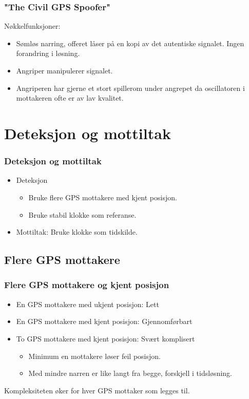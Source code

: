 \documentclass[xcolor=table]{beamer}
\begin{document}
\begin{frame}
  \frametitle{"The Civil GPS Spoofer"}
  Nøkkelfunksjoner:
  \begin{itemize}
    \item Sømløs narring, offeret låser på en kopi av det autentiske signalet. Ingen forandring i løsning.
    \item Angriper manipulerer signalet.
    \item Angriperen har gjerne et stort spillerom under angrepet da oscillatoren i mottakeren ofte er av lav kvalitet.
  \end{itemize}
\end{frame}

\section{Deteksjon og mottiltak}
\begin{frame}
\frametitle{Deteksjon og mottiltak}
  \begin{itemize}
    \item Deteksjon
    \begin{itemize}
      \item Bruke flere GPS mottakere med kjent posisjon.
      \item Bruke stabil klokke som referanse.
    \end{itemize}
    \item Mottiltak: Bruke klokke som tidskilde.
  \end{itemize}
\end{frame}

\subsection{Flere GPS mottakere}
\begin{frame} 
  \frametitle{Flere GPS mottakere og kjent posisjon}
  \begin{itemize}
    \item En GPS mottakere med ukjent posisjon: Lett
    \item En GPS mottakere med kjent posisjon: Gjennomførbart
    \item To GPS mottakere med kjent posisjon: Svært komplisert
    \begin{itemize}
      \item Minimum en mottakere løser feil posisjon.
      \item Med mindre narren er like langt fra begge, forskjell i tidsløsning.  
    \end{itemize}
  \end{itemize}
  Kompleksiteten øker for hver GPS mottaker som legges til.
\end{frame}
\end{document}
